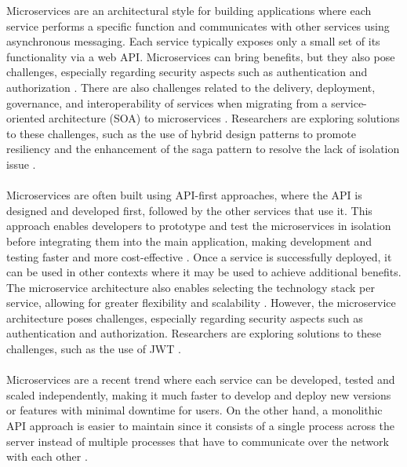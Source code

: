 \documentclass[BIF,Bachelor,nenglish]{twbook}%
\begin{document}
\noindent
Microservices are an architectural style for building applications where each service performs a specific function and communicates with other services using asynchronous messaging. Each service typically exposes only a small set of its functionality via a web API. Microservices can bring benefits, but they also pose challenges, especially regarding security aspects such as authentication and authorization \cite{alm2022} . There are also challenges related to the delivery, deployment, governance, and interoperability of services when migrating from a service-oriented architecture (SOA) to microservices \cite{raj2021} . Researchers are exploring solutions to these challenges, such as the use of hybrid design patterns to promote resiliency and the enhancement of the saga pattern to resolve the lack of isolation issue \cite{ras2022, dar2022} .
\\
\\
Microservices are often built using API-first approaches, where the API is designed and developed first, followed by the other services that use it. This approach enables developers to prototype and test the microservices in isolation before integrating them into the main application, making development and testing faster and more cost-effective \cite{alm2022} . Once a service is successfully deployed, it can be used in other contexts where it may be used to achieve additional benefits. The microservice architecture also enables selecting the technology stack per service, allowing for greater flexibility and scalability \cite{dar2022} . However, the microservice architecture poses challenges, especially regarding security aspects such as authentication and authorization. Researchers are exploring solutions to these challenges, such as the use of JWT \cite{alm2022} .
\\
\\
Microservices are a recent trend where each service can be developed, tested and scaled independently, making it much faster to develop and deploy new versions or features with minimal downtime for users. On the other hand, a monolithic API approach is easier to maintain since it consists of a single process across the server instead of multiple processes that have to communicate over the network with each other \cite{pat2021}.
\end{document}
